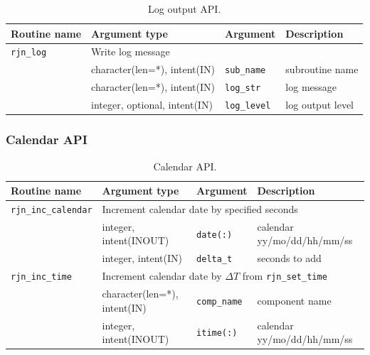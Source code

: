 \documentclass[11pt,a4paper]{report}
\begin{document}
\begin{table}[H]
\begin{center}
\caption{Log output API.}
{\small
\label{table:rjn_api_log}
\begin{tabular}{llll}
\hline\hline
Routine name & Argument type & Argument & Description \\
\hline
 \texttt{rjn\_log} & \multicolumn{3}{l}{Write log message}\\
           &  character(len=*), intent(IN) &  \texttt{sub\_name} & subroutine name\\
           &  character(len=*), intent(IN) &  \texttt{log\_str} & log message\\
           &  integer, optional, intent(IN) &  \texttt{log\_level} & log output level\\
\hline\hline
\end{tabular}
}
\end{center}
\end{table}

\subsubsection{Calendar API}

\begin{table}[H]
\begin{center}
\caption{Calendar API.}
{\small
\label{table:rjn_api_calendar}
\begin{tabular}{llll}
\hline\hline
Routine name & Argument type & Argument & Description \\
\hline
 \texttt{rjn\_inc\_calendar} &  \multicolumn{3}{l}{Increment calendar date by specified seconds}\\
           & integer, intent(INOUT) & \texttt{date(:)}  & calendar yy/mo/dd/hh/mm/ss\\
           & integer, intent(IN) & \texttt{delta\_t} & seconds to add \\
\hline
 \texttt{rjn\_inc\_time} &  \multicolumn{3}{l}{Increment calendar date by $\Delta T$ from \texttt{rjn\_set\_time}}\\
           & character(len=*), intent(IN) & \texttt{comp\_name}  & component name\\
           & integer, intent(INOUT) & \texttt{itime(:)}  & calendar yy/mo/dd/hh/mm/ss\\
\hline\hline
\end{tabular}
}
\end{center}
\end{table}
\end{document}
